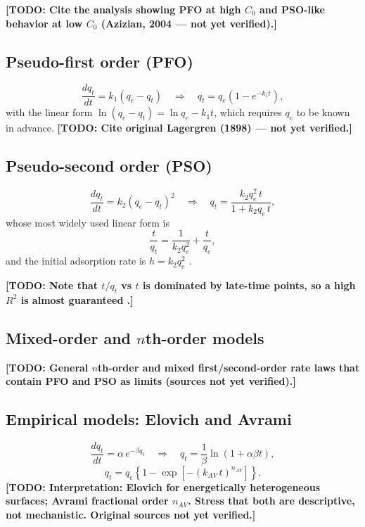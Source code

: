 \documentclass[11pt,a4paper]{article}
\newcommand{\todo}[1]{\textbf{[TODO: #1]}}
\begin{document}
\todo{Cite the analysis showing PFO at high $C_0$ and PSO-like behavior at
low $C_0$ (Azizian, 2004 --- not yet verified).}

\subsection{Pseudo-first order (PFO)}
\label{sec:pfo}
\begin{equation}
  \frac{dq_t}{dt} = k_1 (q_e - q_t)
  \quad\Longrightarrow\quad
  q_t = q_e\left(1 - e^{-k_1 t}\right),
  \label{eq:pfo}
\end{equation}
with the linear form $\ln(q_e - q_t) = \ln q_e - k_1 t$, which requires
$q_e$ to be known in advance.
\todo{Cite original Lagergren (1898) --- not yet verified.}

\subsection{Pseudo-second order (PSO)}
\label{sec:pso}
\begin{equation}
  \frac{dq_t}{dt} = k_2 (q_e - q_t)^2
  \quad\Longrightarrow\quad
  q_t = \frac{k_2 q_e^2\, t}{1 + k_2 q_e\, t},
  \label{eq:pso}
\end{equation}
whose most widely used linear form is
\begin{equation}
  \frac{t}{q_t} = \frac{1}{k_2 q_e^2} + \frac{t}{q_e},
  \label{eq:pso-lin}
\end{equation}
and the initial adsorption rate is $h = k_2 q_e^2$
\parencite{Ho1999_PseudoSecondOrder}.

\todo{Note that $t/q_t$ vs $t$ is dominated by late-time points, so a high
$R^2$ is almost guaranteed \parencite{Simonin2016_PFOvsPSO}.}

\subsection{Mixed-order and \texorpdfstring{$n$th}{nth}-order models}
\todo{General $n$th-order and mixed first/second-order rate laws that
contain PFO and PSO as limits (sources not yet verified).}

\subsection{Empirical models: Elovich and Avrami}
\begin{equation}
  \frac{dq_t}{dt} = \alpha\, e^{-\beta q_t}
  \quad\Longrightarrow\quad
  q_t = \frac{1}{\beta}\ln(1 + \alpha\beta t),
  \label{eq:elovich}
\end{equation}
\begin{equation}
  q_t = q_e\left\{1 - \exp\!\left[-(k_{AV}\, t)^{n_{AV}}\right]\right\}.
  \label{eq:avrami}
\end{equation}
\todo{Interpretation: Elovich for energetically heterogeneous surfaces;
Avrami fractional order $n_{AV}$. Stress that both are descriptive, not
mechanistic. Original sources not yet verified.}
\end{document}
